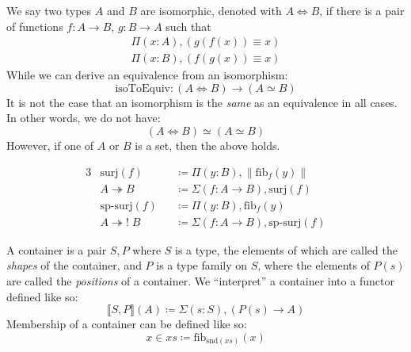 \begin{romdefinition}[Isomorphism] \label{isomorphism}
  We say two types \(A\) and \(B\) are isomorphic, denoted with \(A \iff B\), if
  there is a pair of functions \(f : A \rightarrow B\), \(g : B \rightarrow A\)
  such that
  \begin{equation}
    \begin{aligned}
      \Pi(x : A) , (g(f(x)) \equiv x) \\
      \Pi(x : B) , (f(g(x)) \equiv x)
    \end{aligned}
  \end{equation}
  While we can derive an equivalence from an isomorphism:
  \begin{equation}
    \text{isoToEquiv} : (A \iff B) \rightarrow (A \simeq B)
  \end{equation}
  It is not the case that an isomorphism is the \emph{same} as an equivalence in
  all cases.
  In other words, we do not have:
  \begin{equation}
    (A \iff B) \simeq (A \simeq B)
  \end{equation}
  However, if one of \(A\) or \(B\) is a set, then the above holds.
\end{romdefinition}
\begin{romdefinition} \label{HITs}
\end{romdefinition}
\begin{romdefinition}[Surjections] \label{surjections}
  \begin{alignat}{3}
    &\text{surj}(f)             &&\coloneqq \Pi(y : B) , \lVert \text{fib}_f(y) \rVert \\
    &A \twoheadrightarrow B     &&\coloneqq \Sigma (f : A \rightarrow B) , \text{surj}(f) \label{surj-arrow-eqn} \\
    &\text{sp-surj}(f)          &&\coloneqq \Pi(y : B) , \text{fib}_f(y) \label{sp-surj-eqn} \\
    &A \twoheadrightarrow! \; B &&\coloneqq \Sigma (f : A \rightarrow B) , \text{sp-surj}(f) \label{sp-surj-arrow-eqn}
  \end{alignat}
\end{romdefinition}
\begin{romdefinition}[Containers] \label{container-def}
  A container \cite{abbottContainersConstructingStrictly2005} is a pair
  \(S , P\) where \(S\) is a type, the elements of which are called
  the \emph{shapes} of the container, and \(P\) is a type family on \(S\), where
  the elements of \(P(s)\) are called the \emph{positions} of a container.
  We ``interpret'' a container into a functor defined like so:
  \begin{equation} \label{container-interp}
    \llbracket S , P \rrbracket(A) \coloneqq \Sigma {(s : S)} , \left( P(s) \rightarrow A \right)
  \end{equation}
  Membership of a container can be defined like so:
  \begin{equation} \label{container-membership}
    x \in \mathit{xs} \coloneqq \text{fib}_{\text{snd}(\mathit{xs})}(x)
  \end{equation}
\end{romdefinition}
